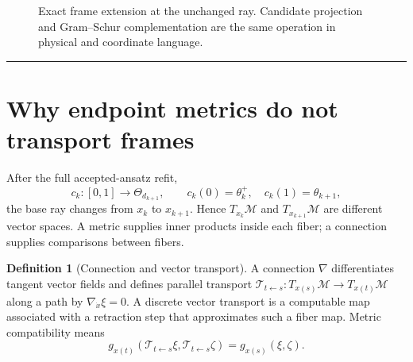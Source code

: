 \documentclass[10pt,twocolumn]{article}
\theoremstyle{definition}
\newtheorem{definition}[theorem]{Definition}
\theoremstyle{remark}
\newcommand{\conceptbreak}{\par\vspace{0.45em}\noindent\textcolor{navy!55}{\rule{\columnwidth}{0.35pt}}\vspace{0.35em}\par}
\newcommand{\R}{\mathbb R}
\newcommand{\M}{\mathcal M}
\begin{document}
\begin{figure}[t]
\centering
{}
\caption{Exact frame extension at the unchanged ray.  Candidate projection and Gram--Schur complementation are the same operation in physical and coordinate language.}
\label{fig:growth}
\end{figure}

\conceptbreak

\section{Why endpoint metrics do not transport frames}
\label{sec:identifiability}

After the full accepted-ansatz refit,
\begin{equation}
 c_k:[0,1]\to\Theta_{d_{k+1}},\qquad
 c_k(0)=\theta_k^+,\quad c_k(1)=\theta_{k+1},
 \label{eq:refitpath}
\end{equation}
the base ray changes from $x_k$ to $x_{k+1}$.  Hence $T_{x_k}\M$ and $T_{x_{k+1}}\M$ are different vector spaces.  A metric supplies inner products inside each fiber; a connection supplies comparisons between fibers.

\begin{definition}[Connection and vector transport]
A connection $\nabla$ differentiates tangent vector fields and defines parallel transport $\mathcal T_{t\leftarrow s}:T_{x(s)}\M\to T_{x(t)}\M$ along a path by $\nabla_{\dot x}\xi=0$.  A discrete vector transport is a computable map associated with a retraction step that approximates such a fiber map.  Metric compatibility means
\begin{equation}
 g_{x(t)}(\mathcal T_{t\leftarrow s}\xi,\mathcal T_{t\leftarrow s}\zeta)
 =g_{x(s)}(\xi,\zeta).
 \label{eq:metriccompat}
\end{equation}
\end{definition}
\end{document}
